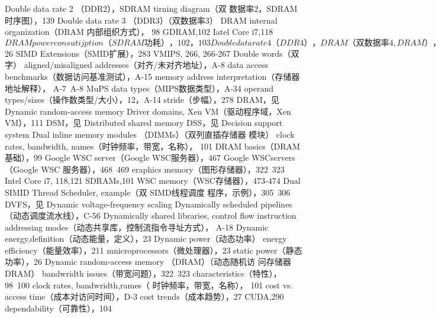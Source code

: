 Double data rate 2 （DDR2），SDRAM tirning diagram（双
数据率2，SDRAM时序图），139
Double data rate 3 （DDR3）（双数据率3）
DRAM internal organization（DRAM 内部组织方式），
98
GDRAM,102
Iatel Core i7,118
$DRAM power consutijption（SDRAM功耗），102，
103
Double data rate 4（DDR4）， DRAM（双数据率 4, DRAM），
99
Double data rate s （DDRs），GDRAM（双数据率5，
GDRAM），102
Double-precision floating point（双精度浮点）
add-divide（加除），C-68
AVX for ×86（x86的AVX），284
data access beachmarks（数据访问基准测试），A-15
Fermi GPU architecture（FermiGPU体系结构），306
foating-point pipeline（浮点流水线），C-65
GTX 280,325,328-330
IBM360,171
556
索引
MIIPS,285,A-38~A-39
MIIPS data transfers （MIPS 教据传输），A-34
MIPS registers （MIIS 寄存器），12，A-34
Moltimedia SIMD vs.GPUs（多媒体SIMID对GPU），
312
operand sizes/types（操作数大小/类型），12
as operand type（作为操作数类型），A-13~A-14
operand usage（操作数便用），297
pipeline timing（流水线时序），C-54
Roofline model（屋顶轮廓线模型），287，$26
SIMD Extensions（SMID扩展），283
VMIPS, 266, 266-267
Double words（双字）
aligned/misaligned addresses（对齐/未对齐地址），A-8
data access benchmarks（数据访问基准测试），A-15
memory address interpretation（存储器地址解释），
A-7~A-8
MuPS data types（MIPS数据类型），A-34
operand types/sizes（操作数类型/大小），12，A-14
stride（步幅），278
DRAM，见 Dynamic random-access memory
Driver domains, Xen VM（驱动程序域，Xen VM），111
DSM，见 Distributed shared memory
DSS，见 Decision support system
Dual inline memory modules （DIMMs）（双列直插存储器
模块）
clock rates, bandwidth, names（时钟频率，带宽，名称），
101
DRAM basics（DRAM基础），99
Google WSC server（Google WSC服务器），467
Google WSCservers（Google WSC 服务器），468~469
eraphics memory（图形存储器），322~323
Intel Core i7, 118,121
SDRAMs,101
WSC memory（WSC存储器），473-474
Dual SIMID Thread Scheduler, example（双 SIMD线程调度
程序，示例），305~306
DVFS，见 Dynamic voltage-frequency scaling
Dynamically scheduled pipelines（动态调度流水线），C-56
Dynamically shared libraries, control flow instruction
addressing modes（动态共享库，控制流指令寻址方式），
A-18
Dynamic energy,definition（动态能量，定义），23
Dynamic power（动态功率）
energy efficiency（能量效率），211
mnicroprocessors（微处理器），23
static power（静态功率），26
Dynamic random-access memory （DRAM）（动态随机访
问存储器 DRAM）
bandwridth issues（带宽问题），322~323
characteristics（特性），98~100
clock rates, bandwridth,rames（ 时钟频率，带宽，名称），
101
cost vs. access time（成本对访问时间），D-3
cost trends（成本趋势），27
CUDA,290
dependability（可靠性），104
